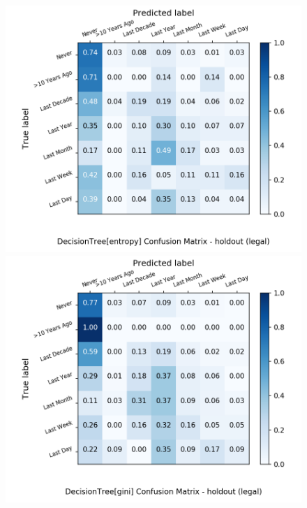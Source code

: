\begin{figure}[H]
	\centering
	\begin{minipage}[b]{0.32\textwidth}
		\includegraphics[width=1.1\textwidth]{Plots/legal_DecisionTree_entropy_balance_False_holdout.png}
	\end{minipage}
	\begin{minipage}[b]{0.32\textwidth}
		\includegraphics[width=1.1\textwidth]{Plots/legal_DecisionTree_gini_balance_False_holdout.png}
	\end{minipage}
	\begin{minipage}[b]{0.32\textwidth}

\end{minipage}
\end{figure}
